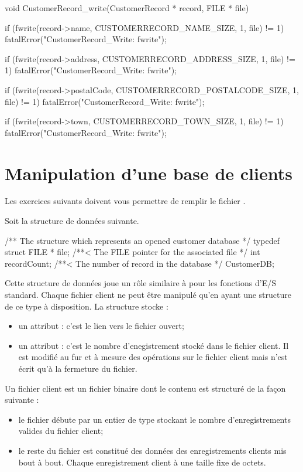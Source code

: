 \begin{csourcecorrection}
void CustomerRecord_write(CustomerRecord * record, FILE * file) {
    if (fwrite(record->name, CUSTOMERRECORD_NAME_SIZE, 1, file) != 1)
        fatalError("CustomerRecord_Write: fwrite");

    if (fwrite(record->address, CUSTOMERRECORD_ADDRESS_SIZE, 1, file) != 1)
        fatalError("CustomerRecord_Write: fwrite");

    if (fwrite(record->postalCode, CUSTOMERRECORD_POSTALCODE_SIZE, 1, file) != 1)
        fatalError("CustomerRecord_Write: fwrite");

    if (fwrite(record->town, CUSTOMERRECORD_TOWN_SIZE, 1, file) != 1)
        fatalError("CustomerRecord_Write: fwrite");
}
\end{csourcecorrection}

\section{Manipulation d'une base de clients}

Les exercices suivants doivent vous permettre de remplir le fichier .

Soit la structure de données suivante.
\begin{csource}
/** The structure which represents an opened customer database */
typedef struct {
    FILE * file; /**< The FILE pointer for the associated file */
    int recordCount; /**< The number of record in the database */
} CustomerDB;
\end{csource}
Cette structure de données joue un rôle similaire à  pour les fonctions d'E/S standard. Chaque fichier client ne peut être manipulé qu'en ayant une structure de ce type à disposition. La structure stocke :
\begin{itemize}
  \item un attribut  : c'est le lien vers le fichier ouvert;
  \item un attribut  : c'est le nombre d'enegistrement stocké dans le fichier client. Il est modifié au fur et à mesure des opérations sur le fichier client mais n'est écrit qu'à la fermeture du fichier.
\end{itemize}

Un fichier client est un fichier binaire dont le contenu est structuré de la façon suivante :
\begin{itemize}
  \item le fichier débute par un entier de type  stockant le nombre d'enregistrements valides du fichier client;
  \item le reste du fichier est constitué des données des enregistrements clients mis bout à bout. Chaque enregistrement client à une taille fixe de  octets.
\end{itemize}

